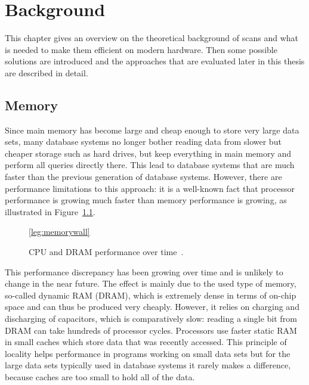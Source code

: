 \chapter{Background}
\label{chapter:background}

This chapter gives an overview on the theoretical background of scans and what
is needed to make them efficient on modern hardware. Then some possible
solutions are introduced and the approaches that are evaluated later in this
thesis are described in detail.

\section{Memory}

Since main memory has become large and cheap enough to store very large data
sets, many database systems no longer bother reading data from slower but
cheaper storage such as hard drives, but keep everything in main memory and
perform all queries directly there. This lead to database systems that are much
faster than the previous generation of database systems. However, there are
performance limitations to this approach: it is a well-known fact that processor
performance is growing much faster than memory performance is growing, as
illustrated in Figure~\ref{fig:memorywall}.

\begin{figure}[h] \begin{center}
\ref*{leg:memorywall}
\end{center}
\caption{CPU and DRAM performance over time~\cite{hennessyarch}.}
\label{fig:memorywall}
\end{figure}

This performance discrepancy has been growing over time and is unlikely to
change in the near future. The effect is mainly due to the used type of memory,
so-called dynamic RAM (DRAM), which is extremely dense in terms of on-chip space
and can thus be produced very cheaply. However, it relies on charging and
discharging of capacitors, which is comparatively slow: reading a single bit from
DRAM can take hundreds of processor cycles. Processors use faster static RAM in
small caches which store data that was recently accessed. This principle of
locality helps performance in programs working on small data sets but for the
large data sets typically used in database systems it rarely makes a difference,
because caches are too small to hold all of the data.

